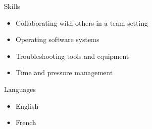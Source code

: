 \documentclass[]{mcdowellcv}
\begin{document}
	\begin{cvsection}{Skills}
		\begin{cvsubsection}{}{}{}
			\begin{itemize}
				\item Collaborating with others in a team setting
				\item Operating software systems
				\item Troubleshooting tools and equipment
				\item Time and pressure management
			\end{itemize}
		\end{cvsubsection}
	\end{cvsection}
	
	\begin{cvsection}{Languages}
		\begin{cvsubsection}{}{}{}
			\begin{itemize}
				\item English
				\item French
			\end{itemize}
		\end{cvsubsection}
	\end{cvsection}
	
	
\end{document}
